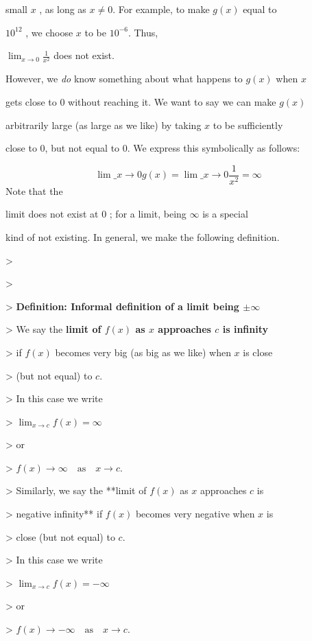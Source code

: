 small $x$ , as long as $x\ne0$. For example, to make $g(x)$ equal to

$10^{12}$ , we choose $x$ to be $10^{-6}$. Thus,

$\lim_{x\to0}\frac{1}{x^2}$ does not exist.



However, we \textit{do} know something about what happens to $g(x)$ when $x$

gets close to 0 without reaching it. We want to say we can make $g(x)$

arbitrarily large (as large as we like) by taking $x$ to be sufficiently

close to 0, but not equal to 0. We express this symbolically as follows:



$$\lim\_{x\to0}g(x)=\lim\_{x\to0}\frac{1}{x^2}=\infty$$ Note that the

limit does not exist at $0$ ; for a limit, being $\infty$ is a special

kind of not existing. In general, we make the following definition.



> 

>

>    \textbf{Definition: Informal definition of a limit being $\pm\infty$}

>    We say the \textbf{limit of $f(x)$ as $x$ approaches $c$ is infinity}

>     if $f(x)$ becomes very big (as big as we like) when $x$ is close

>     (but not equal) to $c$.

>    In this case we write

>    $\lim_{x\to c}f(x)=\infty$

>    or

>    $f(x)\to\infty\quad\text{as}\quad x\to c$.

>    Similarly, we say the **limit of $f(x)$ as $x$ approaches $c$ is

>     negative infinity** if $f(x)$ becomes very negative when $x$ is

>     close (but not equal) to $c$.

>    In this case we write

>    $\lim_{x\to c}f(x)=-\infty$

>    or

>    $f(x)\to-\infty\quad \text{as} \quad x\to c$.



